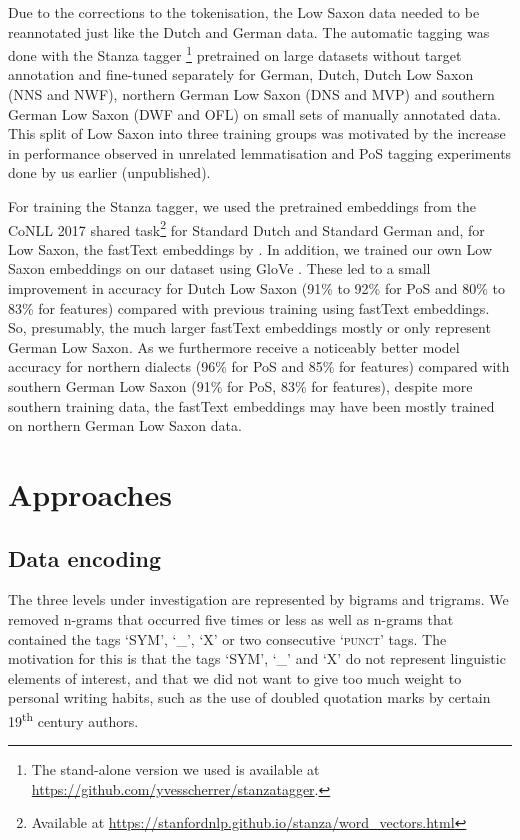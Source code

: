 \documentclass[output=paper,colorlinks,citecolor=brown]{langscibook}
\begin{document}
Due to the corrections to the tokenisation, the Low Saxon data needed to be reannotated just like the Dutch and German data. 
The automatic tagging was done with the Stanza tagger \citep{QiEtAl2020}\footnote{The stand-alone version we used is available at  \url{https://github.com/yvesscherrer/stanzatagger}.} pretrained on large datasets without target annotation and fine-tuned separately for German, Dutch, Dutch Low Saxon (NNS and NWF), northern German Low Saxon (DNS and MVP) and southern German Low Saxon (DWF and OFL) on small sets of manually annotated data. This split of Low Saxon into three training groups was motivated by the increase in performance observed in unrelated lemmatisation and PoS tagging experiments done by us earlier (unpublished). 


For training the Stanza tagger, we used the pretrained embeddings from the CoNLL 2017 shared task\footnote{Available at \url{https://stanfordnlp.github.io/stanza/word_vectors.html}} for Standard Dutch and Standard German and, for Low Saxon, the fastText embeddings by \citet{GraveEtAl2018}. In addition, we trained our own Low Saxon embeddings on our dataset using GloVe \citep{PenningtonEtAl2014}. These led to a small improvement in accuracy for Dutch Low Saxon (91\% to 92\% for PoS and 80\% to 83\% for features) compared with previous training using fastText embeddings. So, presumably, the much larger fastText embeddings mostly or only represent German Low Saxon. As we furthermore receive a noticeably better model accuracy for northern dialects (96\% for PoS and 85\% for features) compared with southern German Low Saxon (91\% for PoS, 83\% for features), despite more southern training data, the fastText embeddings may have been mostly trained on northern German Low Saxon data.

\section{Approaches}
\subsection{Data encoding}

The three levels under investigation are represented by bigrams and trigrams. We removed n-grams that occurred five times or less as well as n-grams that contained the tags `SYM', `\_', `X' or two consecutive `\textsc{punct}' tags. The motivation for this is that the tags `SYM', `\_' and `X' do not represent linguistic elements of interest, and that we did not want to give too much weight to personal writing habits, such as the use of doubled quotation marks by certain 19\textsuperscript{th} century authors. 
\end{document}
